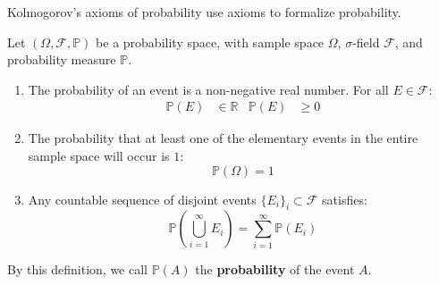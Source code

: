 \documentclass{huhtakm-template-book-v2}
\newcommand{\prob}{\mathbb{P}}
\begin{document}
    Kolmogorov's axioms of probability use axioms to formalize probability.
    \begin{defn}
        Let $(\Omega,\mathcal{F},\prob)$ be a probability space, with sample space $\Omega$, $\sigma$-field $\mathcal{F}$, and probability measure $\prob$.
        \begin{enumerate}
            \item The probability of an event is a non-negative real number. For all $E \in \mathcal{F}$:
            \begin{align*}
                \prob(E) &\in \mathbb{R} & \prob(E) &\geq 0
            \end{align*}
            \item The probability that at least one of the elementary events in the entire sample space will occur is $1$:
            \begin{equation*}
                \prob(\Omega) = 1
            \end{equation*}
            \item Any countable sequence of disjoint events $\{E_{i}\}_{i}\subset\mathcal{F}$ satisfies:
            \begin{equation*}
                \prob\left(\bigcup_{i = 1}^{\infty}E_{i}\right) = \sum_{i = 1}^{\infty}\prob(E_{i})
            \end{equation*}
        \end{enumerate}
        By this definition, we call $\prob(A)$ the \textbf{probability} of the event $A$.
    \end{defn}
    \newpage
\end{document}
